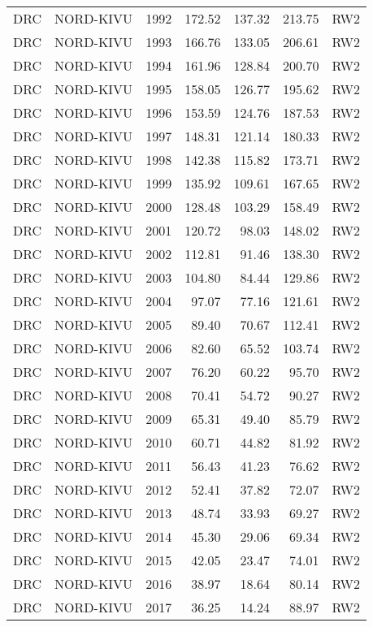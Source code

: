\begin{longtable}{lllrrrl}
  DRC & NORD-KIVU & 1992 & 172.52 & 137.32 & 213.75 & RW2 \\ 
  DRC & NORD-KIVU & 1993 & 166.76 & 133.05 & 206.61 & RW2 \\ 
  DRC & NORD-KIVU & 1994 & 161.96 & 128.84 & 200.70 & RW2 \\ 
  DRC & NORD-KIVU & 1995 & 158.05 & 126.77 & 195.62 & RW2 \\ 
  DRC & NORD-KIVU & 1996 & 153.59 & 124.76 & 187.53 & RW2 \\ 
  DRC & NORD-KIVU & 1997 & 148.31 & 121.14 & 180.33 & RW2 \\ 
  DRC & NORD-KIVU & 1998 & 142.38 & 115.82 & 173.71 & RW2 \\ 
  DRC & NORD-KIVU & 1999 & 135.92 & 109.61 & 167.65 & RW2 \\ 
  DRC & NORD-KIVU & 2000 & 128.48 & 103.29 & 158.49 & RW2 \\ 
  DRC & NORD-KIVU & 2001 & 120.72 & 98.03 & 148.02 & RW2 \\ 
  DRC & NORD-KIVU & 2002 & 112.81 & 91.46 & 138.30 & RW2 \\ 
  DRC & NORD-KIVU & 2003 & 104.80 & 84.44 & 129.86 & RW2 \\ 
  DRC & NORD-KIVU & 2004 & 97.07 & 77.16 & 121.61 & RW2 \\ 
  DRC & NORD-KIVU & 2005 & 89.40 & 70.67 & 112.41 & RW2 \\ 
  DRC & NORD-KIVU & 2006 & 82.60 & 65.52 & 103.74 & RW2 \\ 
  DRC & NORD-KIVU & 2007 & 76.20 & 60.22 & 95.70 & RW2 \\ 
  DRC & NORD-KIVU & 2008 & 70.41 & 54.72 & 90.27 & RW2 \\ 
  DRC & NORD-KIVU & 2009 & 65.31 & 49.40 & 85.79 & RW2 \\ 
  DRC & NORD-KIVU & 2010 & 60.71 & 44.82 & 81.92 & RW2 \\ 
  DRC & NORD-KIVU & 2011 & 56.43 & 41.23 & 76.62 & RW2 \\ 
  DRC & NORD-KIVU & 2012 & 52.41 & 37.82 & 72.07 & RW2 \\ 
  DRC & NORD-KIVU & 2013 & 48.74 & 33.93 & 69.27 & RW2 \\ 
  DRC & NORD-KIVU & 2014 & 45.30 & 29.06 & 69.34 & RW2 \\ 
  DRC & NORD-KIVU & 2015 & 42.05 & 23.47 & 74.01 & RW2 \\ 
  DRC & NORD-KIVU & 2016 & 38.97 & 18.64 & 80.14 & RW2 \\ 
  DRC & NORD-KIVU & 2017 & 36.25 & 14.24 & 88.97 & RW2 \\ 

\end{longtable}
